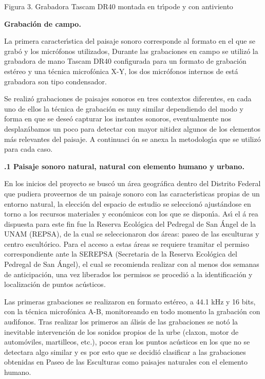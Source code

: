 \begin{center}
Figura 3. Grabadora Tascam DR40 montada en tr\'{\i}pode y con antiviento
\end{center}

\textbf{ Grabaci\'{o}n de campo.}

La primera caracter\'{\i}stica del paisaje sonoro corresponde al formato en
el que se grab\'{o} y los micr\'{o}fonos utilizados, Durante las grabaciones
en campo se utiliz\'{o} la grabadora de mano Tascam DR40 configurada para un
formato de grabaci\'{o}n est\'{e}reo y una t\'{e}cnica microf\'{o}nica X-Y,
los dos micr\'{o}fonos internos de est\'{a} grabadora son tipo condensador.

Se realiz\'{o} grabaciones de paisajes sonoros en tres contextos diferentes,
en cada uno de ellos la t\'{e}cnica de grabaci\'{o}n es muy similar
dependiendo del modo y forma en que se dese\'{o} capturar los instantes
sonoros, eventualmente nos desplaz\'{a}bamos un poco para detectar con mayor
nitidez algunos de los elementos m\'{a}s relevantes del paisaje. A continuaci%
\'{o}n se anexa la metodolog\'{\i}a que se utiliz\'{o} para cada caso.

\textbf{\qquad {}.1 Paisaje sonoro natural, natural con elemento
humano y urbano.}

En los inicios del proyecto se busc\'{o} un \'{a}rea geogr\'{a}fica dentro
del Distrito Federal que pudiera proveernos de un paisaje sonoro con las
caracter\'{\i}sticas propias de un entorno natural, la elecci\'{o}n del
espacio de estudio se seleccion\'{o} ajust\'{a}ndose en torno a los recursos
materiales y econ\'{o}micos con los que se dispon\'{\i}a. As\'{\i} el \'{a}%
rea dispuesta para este fin fue la Reserva Ecol\'{o}gica del Pedregal de San
\'{A}ngel de la UNAM (REPSA), de la cual se seleccionaron dos \'{a}reas:
paseo de las esculturas y centro escult\'{o}rico. Para el acceso a estas
\'{a}reas se requiere tramitar el permiso correspondiente ante la SEREPSA
(Secretaria de la Reserva Ecol\'{o}gica del Pedregal de San \'{A}ngel), el
cual se recomienda realizar con al menos dos semanas de anticipaci\'{o}n,
una vez liberados los permisos se procedi\'{o} a la identificaci\'{o}n y
localizaci\'{o}n de puntos ac\'{u}sticos.

Las primeras grabaciones se realizaron en formato est\'{e}reo, a 44.1 kHz y
16 bits, con la t\'{e}cnica microf\'{o}nica A-B, monitoreando en todo
momento la grabaci\'{o}n con aud\'{\i}fonos. Tras realizar los primeros an%
\'{a}lisis de las grabaciones se not\'{o} la inevitable intervenci\'{o}n de
los sonidos propios de la urbe (claxon, motor de autom\'{o}viles,
martilleos, etc.), pocos eran los puntos ac\'{u}sticos en los que no se
detectara algo similar y es por esto que se decidi\'{o} clasificar a las
grabaciones obtenidas en Paseo de las Esculturas como paisajes naturales con
el elemento humano.


